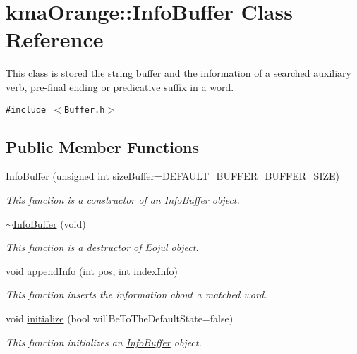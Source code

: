 \hypertarget{classkmaOrange_1_1InfoBuffer}{
\section{kmaOrange::InfoBuffer Class Reference}
\label{classkmaOrange_1_1InfoBuffer}
}
This class is stored the string buffer and the information of a searched auxiliary verb, pre-final ending or predicative suffix in a word.  


{\tt \#include $<$Buffer.h$>$}

\subsection*{Public Member Functions}
\begin{CompactItemize}
\item 
\hyperlink{classkmaOrange_1_1InfoBuffer_13bfbfdc570346e62881d627a35c1621}{InfoBuffer} (unsigned int sizeBuffer=DEFAULT\_\-BUFFER\_\-BUFFER\_\-SIZE)
\begin{CompactList}\small\item\em This function is a constructor of an \hyperlink{classkmaOrange_1_1InfoBuffer}{InfoBuffer} object. \item\end{CompactList}\item 
\hyperlink{classkmaOrange_1_1InfoBuffer_a329cdffba17095fca5d72be3d209cd5}{$\sim$InfoBuffer} (void)
\begin{CompactList}\small\item\em This function is a destructor of \hyperlink{classkmaOrange_1_1Eojul}{Eojul} object. \item\end{CompactList}\item 
void \hyperlink{classkmaOrange_1_1InfoBuffer_20a9edb5bc18baabef3abc9841bb3e91}{appendInfo} (int pos, int indexInfo)
\begin{CompactList}\small\item\em This function inserts the information about a matched word. \item\end{CompactList}\item 
void \hyperlink{classkmaOrange_1_1InfoBuffer_8f70fa82290a938617e23f0832daa02b}{initialize} (bool willBeToTheDefaultState=false)
\begin{CompactList}\small\item\em This function initializes an \hyperlink{classkmaOrange_1_1InfoBuffer}{InfoBuffer} object. \item\end{CompactList}\item 

\end{CompactItemize}
